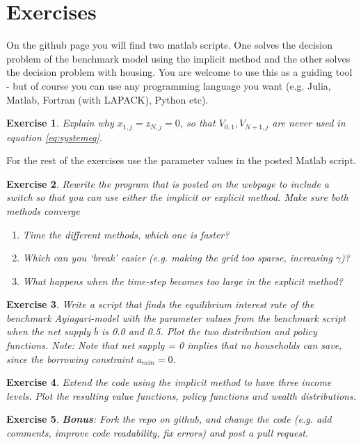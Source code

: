 \documentclass[12pt]{article}
\DeclareMathOperator{\1}{\mathbbm{1}}
\newtheorem{exercise}{Exercise}
\begin{document}
\section*{Exercises}
On the github page you will find two matlab scripts. One solves the decision problem of the benchmark model using the implicit method and the other solves the decision problem with housing. You are welcome to use this as a guiding tool - but of course you can use any programming language you want (e.g. Julia, Matlab, Fortran (with LAPACK), Python etc).

\begin{exercise}
Explain why $x_{1,j}=z_{N,j}=0$, so that $V_{0,1},V_{N+1,j}$ are never used in equation \eqref{eq:systemeq}.  
\end{exercise}

For the rest of the exercises use the parameter values in the posted Matlab script.
\begin{exercise}
Rewrite the program that is posted on the webpage to include a switch so that you can use either the implicit or explicit method. Make sure both methods converge

\begin{enumerate} 
\item Time the different methods, which one is faster? 
\item Which can you `break' easier (e.g. making the grid too sparse, increasing $\gamma$)? 
\item What happens when the time-step becomes too large in the explicit method?
\end{enumerate}
\end{exercise}

\begin{exercise}
Write a script that finds the equilibrium interest rate of the benchmark Ayiagari-model with the parameter values from the benchmark script when the net supply $\bar b$ is 0.0 and 0.5. Plot the two distribution and policy functions. \textit{Note:} Note that net supply = 0 implies that no households can save, since the borrowing constraint $a_{min}=0$.
\end{exercise}

\begin{exercise}
Extend the code using the implicit method to have three income levels. Plot the resulting value functions, policy functions and wealth distributions.
\end{exercise}

\begin{exercise}{\textbf{Bonus}}: Fork the repo on github, and change the code (e.g. add comments, improve code readability, fix errors) and post a pull request.
\end{exercise}
\end{document}
